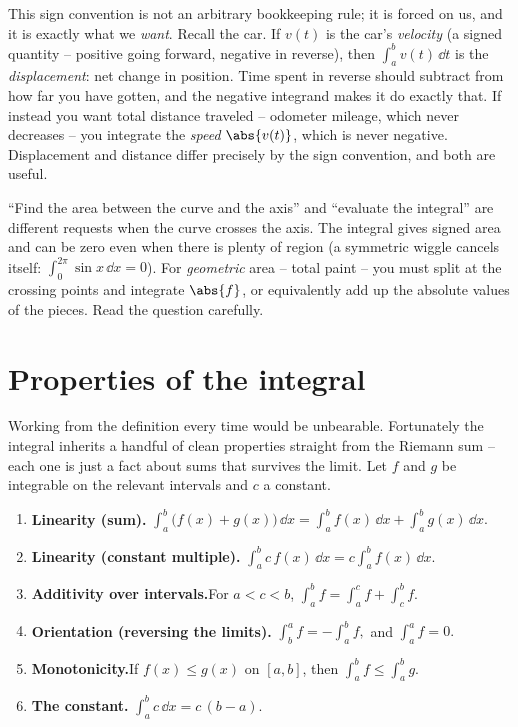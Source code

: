 This sign convention is not an arbitrary bookkeeping rule; it is forced on us,
and it is exactly what we \emph{want}. Recall the car. If $v(t)$ is the car's
\emph{velocity} (a signed quantity -- positive going forward, negative in
reverse), then $\int_a^b v(t)\,\dd t$ is the \emph{displacement}: net change in
position. Time spent in reverse should subtract from how far you have gotten, and
the negative integrand makes it do exactly that. If instead you want total
distance traveled -- odometer mileage, which never decreases -- you integrate the
\emph{speed} $\abs{v(t)}$, which is never negative. Displacement and distance
differ precisely by the sign convention, and both are useful.

\begin{trapbox}
``Find the area between the curve and the axis'' and ``evaluate the integral''
are different requests when the curve crosses the axis. The integral gives signed
area and can be zero even when there is plenty of region (a symmetric wiggle
cancels itself: $\int_0^{2\pi}\sin x\,\dd x = 0$). For \emph{geometric} area --
total paint -- you must split at the crossing points and integrate $\abs{f}$, or
equivalently add up the absolute values of the pieces. Read the question
carefully.
\end{trapbox}

\section{Properties of the integral}
\label{ch20:properties}

Working from the definition every time would be unbearable. Fortunately the
integral inherits a handful of clean properties straight from the Riemann sum --
each one is just a fact about sums that survives the limit. Let $f$ and $g$ be
integrable on the relevant intervals and $c$ a constant.

\begin{focusbox}
\begin{enumerate}[label=\textbf{(\arabic*)}]
\item \textbf{Linearity (sum).}\quad
  $\displaystyle \int_a^b \big(f(x)+g(x)\big)\,\dd x
   = \int_a^b f(x)\,\dd x + \int_a^b g(x)\,\dd x.$
\item \textbf{Linearity (constant multiple).}\quad
  $\displaystyle \int_a^b c\,f(x)\,\dd x = c\int_a^b f(x)\,\dd x.$
\item \textbf{Additivity over intervals.}\quad For $a < c < b$,
  $\displaystyle \int_a^b f = \int_a^c f + \int_c^b f.$
\item \textbf{Orientation (reversing the limits).}\quad
  $\displaystyle \int_b^a f = -\int_a^b f,$ \quad and \quad
  $\displaystyle \int_a^a f = 0.$
\item \textbf{Monotonicity.}\quad If $f(x) \le g(x)$ on $[a,b]$, then
  $\displaystyle \int_a^b f \le \int_a^b g.$
\item \textbf{The constant.}\quad
  $\displaystyle \int_a^b c \,\dd x = c\,(b-a).$
\end{enumerate}
\end{focusbox}

